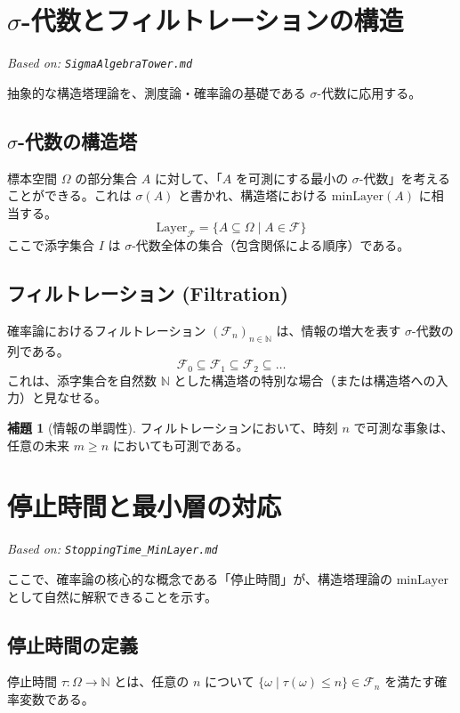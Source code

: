 \documentclass[a4paper,11pt]{ltjsarticle}
\theoremstyle{definition}
\newtheorem{lemma}[definition]{補題}
\newcommand{\N}{\mathbb{N}}
\newcommand{\OmegaSpace}{\Omega}
\newcommand{\F}{\mathcal{F}}
\newcommand{\Tau}{\tau}
\newcommand{\Layer}[1]{\mathrm{Layer}_{#1}}
\newcommand{\MinLayer}{\mathrm{minLayer}}
\begin{document}
\section{$\sigma$-代数とフィルトレーションの構造}
\label{sec:sigma_algebra}
\textit{Based on: \texttt{SigmaAlgebraTower.md}}

抽象的な構造塔理論を、測度論・確率論の基礎である $\sigma$-代数に応用する。

\subsection{$\sigma$-代数の構造塔}
標本空間 $\OmegaSpace$ の部分集合 $A$ に対して、「$A$ を可測にする最小の $\sigma$-代数」を考えることができる。これは $\sigma(A)$ と書かれ、構造塔における $\MinLayer(A)$ に相当する。
\[ \Layer{\F} = \{A \subseteq \OmegaSpace \mid A \in \F\} \]
ここで添字集合 $I$ は $\sigma$-代数全体の集合（包含関係による順序）である。

\subsection{フィルトレーション (Filtration)}
確率論におけるフィルトレーション $(\F_n)_{n \in \N}$ は、情報の増大を表す $\sigma$-代数の列である。
\[ \F_0 \subseteq \F_1 \subseteq \F_2 \subseteq \dots \]
これは、添字集合を自然数 $\N$ とした構造塔の特別な場合（または構造塔への入力）と見なせる。

\begin{lemma}[情報の単調性]
フィルトレーションにおいて、時刻 $n$ で可測な事象は、任意の未来 $m \ge n$ においても可測である。
\end{lemma}

\section{停止時間と最小層の対応}
\label{sec:stopping_time}
\textit{Based on: \texttt{StoppingTime\_MinLayer.md}}

ここで、確率論の核心的な概念である「停止時間」が、構造塔理論の $\MinLayer$ として自然に解釈できることを示す。

\subsection{停止時間の定義}
停止時間 $\Tau: \OmegaSpace \to \N$ とは、任意の $n$ について $\{\omega \mid \Tau(\omega) \le n\} \in \F_n$ を満たす確率変数である。
\end{document}
